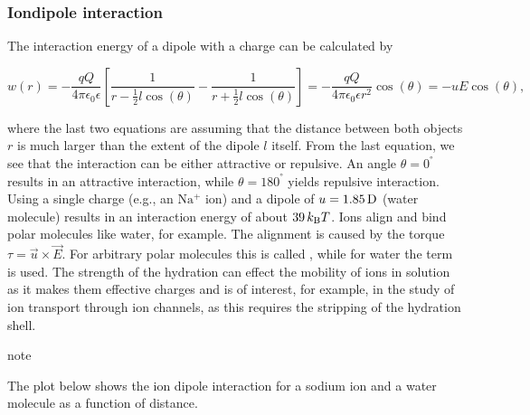 \documentclass[letterpaper,10pt,english]{sphinxmanual}
\begin{document}
\subsubsection{Ion\textendash{}dipole interaction}
\label{\detokenize{notebooks/L7/1_Forces and Interactions:Ion_dipole-interaction}}
\sphinxAtStartPar
The interaction energy of a dipole with a charge can be calculated by

\sphinxAtStartPar
\begin{equation}
w(r)=-\frac{qQ}{4\pi\epsilon_{0}\epsilon}\left [ \frac{1}{r-\frac{1}{2}l \cos(\theta)}-\frac{1}{r+\frac{1}{2}l \cos(\theta)}\right ]=-\frac{qQ}{4\pi\epsilon_{0}\epsilon r^2}\cos(\theta)=-uE\cos(\theta),
\label{eq:energy}
\end{equation}

\sphinxAtStartPar
where the last two equations are assuming that the distance between both objects \(r\) is much larger than the extent of the dipole \(l\) itself. From the last equation, we see that the interaction can be either attractive or repulsive. An angle \(θ=0^°\) results in an attractive interaction, while \(θ=180^°\) yields repulsive interaction. Using a single charge (e.g., an \(\mathrm{Na^+}\) ion) and a dipole of \(u=1.85\, {\rm D}\) (water molecule) results in an interaction
energy of about \(39\, k_{\rm B}T\). Ions align and bind polar molecules like water, for example. The alignment is caused by the torque \(\tau=\vec{u}\times \vec{E}\). For arbitrary polar molecules this is called , while for water the term  is used. The strength of the hydration can effect the mobility of ions in solution as it makes them effective charges and is of interest, for example, in the study of ion transport through ion channels, as this requires the
stripping of the hydration shell.

\begin{sphinxadmonition}{note}{}\unskip
\sphinxAtStartPar
{}
\end{sphinxadmonition}

\sphinxAtStartPar
The plot below shows the ion dipole interaction for a sodium ion and a water molecule as a function of distance.
\end{document}
